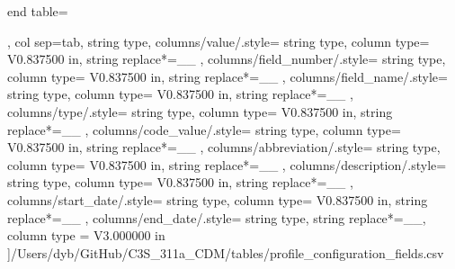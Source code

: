 \begin{landscape}
\begin{longtable}
    end table=\end{longtable},
    col sep=tab,
    string type,
    columns/value/.style={
            string type, 
            column type= V{0.837500 in}, 
            string replace*={_}{\_}
        },
    columns/field_number/.style={
            string type, 
            column type= V{0.837500 in}, 
            string replace*={_}{\_}
        },
    columns/field_name/.style={
            string type, 
            column type= V{0.837500 in}, 
            string replace*={_}{\_}
        },
    columns/type/.style={
            string type, 
            column type= V{0.837500 in}, 
            string replace*={_}{\_}
        },
    columns/code_value/.style={
            string type, 
            column type= V{0.837500 in}, 
            string replace*={_}{\_}
        },
    columns/abbreviation/.style={
            string type, 
            column type= V{0.837500 in}, 
            string replace*={_}{\_}
        },
    columns/description/.style={
            string type, 
            column type= V{0.837500 in}, 
            string replace*={_}{\_}
        },
    columns/start_date/.style={
            string type, 
            column type= V{0.837500 in}, 
            string replace*={_}{\_}
        },
    columns/end_date/.style={
            string type, 
            string replace*={_}{\_},
            column type = V{3.000000 in}
        }
    ]{/Users/dyb/GitHub/C3S_311a_CDM/tables/profile_configuration_fields.csv}
\end{landscape}
